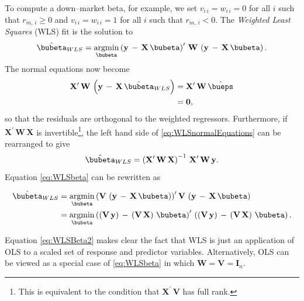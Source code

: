 \documentclass[graybox,envcountchap,sectrefs]{svmono}\usepackage[]{graphicx}\usepackage[]{xcolor}
\begin{document}
\begin{appendices}
To compute a down--market beta, for example, we set $v_{i\,i}=w_{i\,i}=0$
for all $i$ such that $r_{m,\,i}\geqslant0$ and $v_{i\,i}=w_{i\,i}=1$
for all $i$ such that $r_{m,\,i}<0$. The \emph{Weighted Least Squares}
(WLS) fit is the solution to
\begin{equation}
\hat{\bubeta}_{WLS}=\underset{\bubeta}{\mathrm{argmin}}\left(\mathrm{\mathbf{y}}\,-\,\mathrm{\mathbf{X}}\,\bubeta\right)^{\prime}\,\mathrm{\mathbf{W}}\,\left(\mathrm{\mathbf{y}}\,-\,\mathrm{\mathbf{X}}\,\bubeta\right).\label{eq:WLSbeta}
\end{equation}
The normal equations now become
\begin{align}
\mathbf{X}^{\prime}\,\mathbf{W}\,\left(\mathbf{y}\,-\,\mathbf{X}\,\hat{\bubeta}_{WLS}\right) & =\mathbf{X}^{\prime}\,\mathbf{W}\,\hat{\bueps}\nonumber \\
 & =\mathbf{0},\label{eq:WLSnormalEquations}
\end{align}
so that the residuals are orthogonal to the weighted regressors. Furthermore,
if $\mathbf{X}^{\prime}\,\mathbf{W}\,\mathbf{X}$ is invertible\footnote{This is equivalent to the condition that $\mathrm{\mathbf{X}}^{\prime}\,\mathrm{\mathbf{V}}$
has full rank.}, the left hand side of \eqref{eq:WLSnormalEquations} can be rearranged
to give
\begin{equation}
\hat{\bubeta}_{WLS}=\left(\mathrm{\mathbf{X}}^{\prime}\,\mathrm{\mathbf{W}}\,\mathrm{\mathbf{X}}\right)^{-1}\,\mathrm{\mathbf{X}}^{\prime}\,\mathrm{\mathbf{W}}\,\mathbf{y}.\label{eq:WLSbeta1}
\end{equation}
Equation \eqref{eq:WLSbeta} can be rewritten as

\begin{align}
\hat{\bubeta}_{WLS} & =\underset{\bubeta}{\mathrm{argmin}}\left(\mathbf{V}\,\left(\mathrm{\mathbf{y}}\,-\,\mathrm{\mathbf{X}}\,\bubeta\right)\right)^{\prime}\mathrm{\mathbf{\mathbf{V}}}\,\left(\mathrm{\mathbf{y}}\,-\,\mathrm{\mathbf{X}}\,\bubeta\right)\nonumber \\
 & =\underset{\bubeta}{\mathrm{argmin}}\left(\left(\mathbf{V}\,\mathrm{\mathbf{y}}\right)\,-\,\left(\mathbf{V}\,\mathrm{\mathbf{X}}\right)\,\bubeta\right)^{\prime}\,\left(\left(\mathbf{V}\,\mathrm{\mathbf{y}}\right)\,-\,\left(\mathbf{V}\,\mathrm{\mathbf{X}}\right)\,\bubeta\right).\label{eq:WLSBeta2}
\end{align}

Equation \eqref{eq:WLSBeta2} makes clear the fact that WLS is just
an application of OLS to a scaled set of response and predictor variables.
Alternatively, OLS can be viewed as a special case of \eqref{eq:WLSbeta}
in which $\mathrm{\mathbf{W}}=\mathrm{\mathbf{V}}=\mathrm{\mathbf{I}}_{n}$.


\end{appendices}
\end{document}
